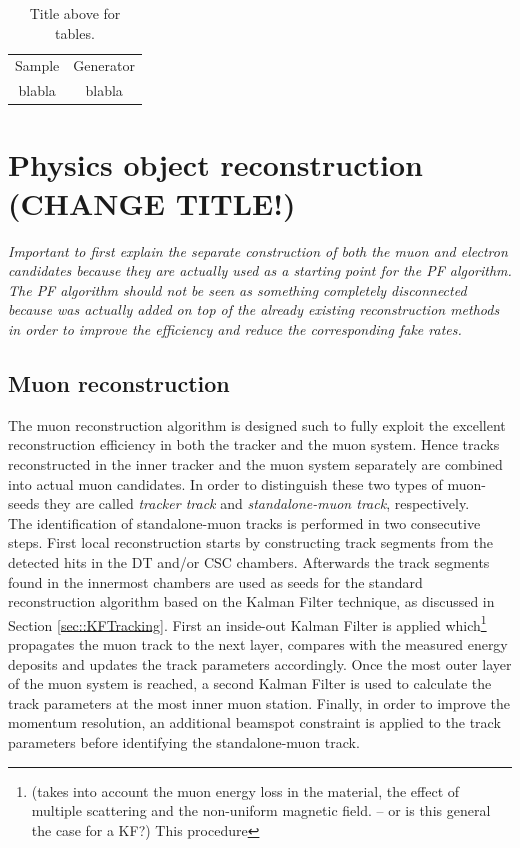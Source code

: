 \begin{table}[h!t]
 \caption{Title above for tables.} \label{table::Samples}
 \centering
 \begin{tabular}{|c|c|}
  \hline
  Sample & Generator \\
  blabla & blabla \\
  \hline
 \end{tabular}
\end{table}

\section{Physics object reconstruction (CHANGE TITLE!)} \label{sec::PhysicsObjects}

\textit{Important to first explain the separate construction of both the muon and electron candidates because they are actually used as a starting point for the PF algorithm. The PF algorithm should not be seen as something completely disconnected because was actually added on top of the already existing reconstruction methods in order to improve the efficiency and reduce the corresponding fake rates.}

\subsection{Muon reconstruction}\label{subsec::Muon}

The muon reconstruction algorithm is designed such to fully exploit the excellent reconstruction efficiency in both the tracker and the muon system.
Hence tracks reconstructed in the inner tracker and the muon system separately are combined into actual muon candidates. In order to distinguish these two types of muon-seeds they are called \textit{tracker track} and \textit{standalone-muon track}, respectively.
\\
The identification of standalone-muon tracks is performed in two consecutive steps. First local reconstruction starts by constructing track segments from the detected hits in the DT and/or CSC chambers. Afterwards the track segments found in the innermost chambers are used as seeds for the standard reconstruction algorithm based on the Kalman Filter technique, as discussed in Section \ref{sec::KFTracking}. First an inside-out Kalman Filter is applied which\footnote{ (takes into account the muon energy loss in the material, the effect of multiple scattering and the non-uniform magnetic field. -- or is this general the case for a KF?) This procedure} propagates the muon track to the next layer, compares with the measured energy deposits and updates the track parameters accordingly. Once the most outer layer of the muon system is reached, a second Kalman Filter is used to calculate the track parameters at the most inner muon station. Finally, in order to improve the momentum resolution, an additional beamspot constraint is applied to the track parameters before identifying the standalone-muon track.

